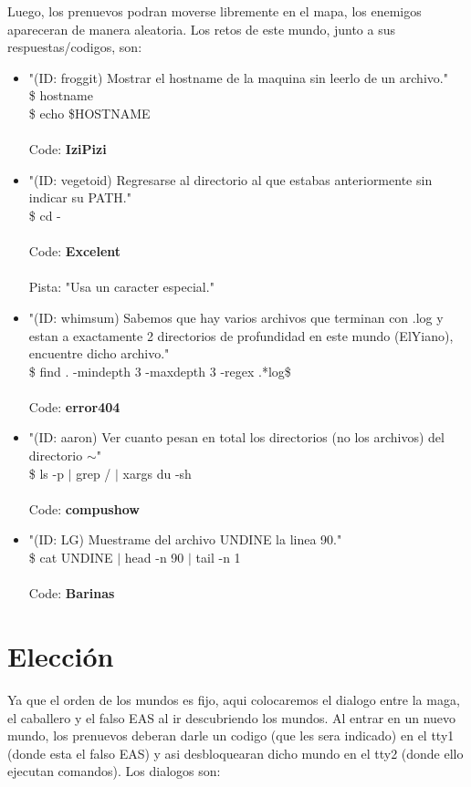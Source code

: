 \documentclass[a4paper,10pt]{article}
\begin{document}
	Luego, los prenuevos podran moverse libremente en el mapa, los enemigos apareceran de manera aleatoria. Los retos de este mundo, junto a sus respuestas/codigos, son:
	
	\begin{itemize}
		\item "(ID: froggit) Mostrar el hostname de la maquina sin leerlo de un archivo." \\ 
			\$ hostname\\
			\$ echo \$HOSTNAME\\ \\
			Code: \textbf{IziPizi}
			
		\item "(ID: vegetoid) Regresarse al directorio al que estabas anteriormente sin indicar su PATH."\\
			\$ cd -\\ \\
			Code: \textbf{Excelent} \\ \\
			Pista: "Usa un caracter especial."
			
		\item "(ID: whimsum) Sabemos que hay varios archivos que terminan con .log y estan a exactamente 2 directorios de profundidad en este mundo (ElYiano), encuentre dicho archivo."\\
			\$ find . -mindepth 3 -maxdepth 3 -regex .*log\$ \\ \\
			Code: \textbf{error404}
			
		\item "(ID: aaron) Ver cuanto pesan en total los directorios (no los archivos) del directorio $\sim$"\\
			\$ ls -p $|$ grep / $|$ xargs du -sh \\ \\
			Code: \textbf{compushow}
			
		\item "(ID: LG) Muestrame del archivo UNDINE la linea 90."\\
			\$ cat UNDINE $|$ head -n 90 $|$ tail -n 1 \\ \\
			Code: \textbf{Barinas}
	\end{itemize}
	
\section{Elecci\'on}
	Ya que el orden de los mundos es fijo, aqui colocaremos el dialogo entre la maga, el caballero y el falso EAS al ir descubriendo los mundos. Al entrar en un nuevo mundo, los prenuevos deberan darle un codigo (que les sera indicado) en el tty1 (donde esta el falso EAS) y asi desbloquearan dicho mundo en el tty2 (donde ello ejecutan comandos). Los dialogos son: 
	
\end{document}
